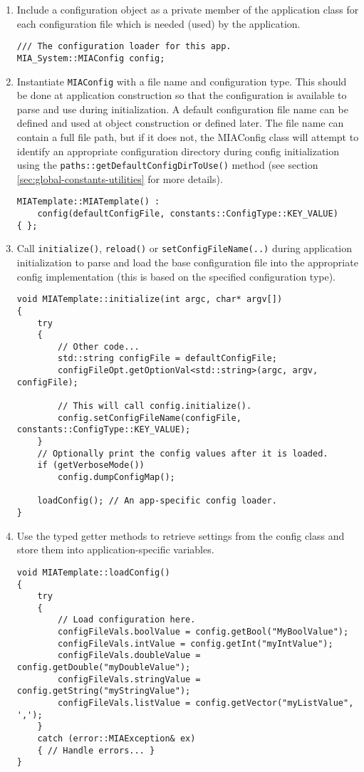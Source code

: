 \begin{enumerate}
	\item Include a configuration object as a private member of the application class for each configuration file which is needed (used) by the application.
	\begin{lstlisting}[style=cppstyle]
/// The configuration loader for this app.
MIA_System::MIAConfig config;
	\end{lstlisting}
	\item Instantiate \texttt{MIAConfig} with a file name and configuration type. This should be done at application construction so that the configuration is available to parse and use during initialization. A default configuration file name can be defined and used at object construction or defined later. The file name can contain a full file path, but if it does not, the MIAConfig class will attempt to identify an appropriate configuration directory during config initialization using the \texttt{paths::getDefaultConfigDirToUse()} method (see section \ref{sec:global-constants-utilities} for more details).
	\begin{lstlisting}[style=cppstyle]
MIATemplate::MIATemplate() : 
	config(defaultConfigFile, constants::ConfigType::KEY_VALUE)                      
{ };
	\end{lstlisting}
	\item Call \texttt{initialize()}, \texttt{reload()} or \texttt{setConfigFileName(..)} during application initialization to parse and load the base configuration file into the appropriate config implementation (this is based on the specified configuration type).
	\begin{lstlisting}[style=cppstyle]
void MIATemplate::initialize(int argc, char* argv[])
{
	try
	{    
		// Other code...
		std::string configFile = defaultConfigFile;
		configFileOpt.getOptionVal<std::string>(argc, argv, configFile);
		
		// This will call config.initialize().
		config.setConfigFileName(configFile, constants::ConfigType::KEY_VALUE);
	}
	// Optionally print the config values after it is loaded.
	if (getVerboseMode())
		config.dumpConfigMap();
	
	loadConfig(); // An app-specific config loader.
}
	\end{lstlisting}
	\item Use the typed getter methods to retrieve settings from the config class and store them into application-specific variables.
	\begin{lstlisting}[style=cppstyle]
void MIATemplate::loadConfig()
{
	try
	{
		// Load configuration here.
		configFileVals.boolValue = config.getBool("MyBoolValue");
		configFileVals.intValue = config.getInt("myIntValue");
		configFileVals.doubleValue = config.getDouble("myDoubleValue");
		configFileVals.stringValue = config.getString("myStringValue");
		configFileVals.listValue = config.getVector("myListValue", ',');
	}
	catch (error::MIAException& ex)
	{ // Handle errors... }
}
	\end{lstlisting}
\end{enumerate}

